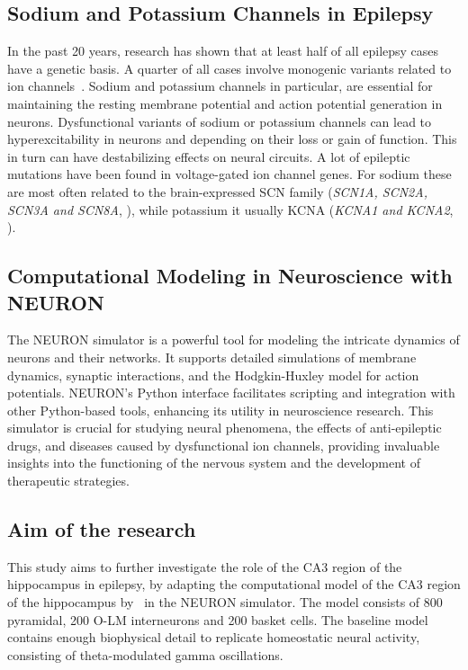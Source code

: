 \subsection{Sodium and Potassium Channels in Epilepsy}
In the past 20 years, research has shown that at least half of all epilepsy cases have a genetic basis.
A quarter of all cases involve monogenic variants related to ion channels~\parencite{strianoGeneticTestingPrecision2020,oyrerIonChannelsGenetic2018}.
Sodium and potassium channels in particular, are essential for maintaining the resting
membrane potential and action potential generation in neurons.
Dysfunctional variants of sodium or potassium channels can lead to hyperexcitability in neurons and depending on their loss or gain of function.
This in turn can have destabilizing effects on neural circuits.
A lot of epileptic mutations have been found in voltage-gated ion channel genes.
For sodium these are most often related to the brain-expressed SCN family (\textit{SCN1A, SCN2A, SCN3A and SCN8A}, \textcite{brunklausSodiumChannelEpilepsies2020}), 
while potassium it usually KCNA (\textit{KCNA1 and KCNA2}, \textcite{gaoPotassiumChannelsEpilepsy2022}).

\subsection{Computational Modeling in Neuroscience with NEURON}
The NEURON simulator is a powerful tool for modeling the intricate dynamics 
of neurons and their networks. It supports detailed simulations of membrane 
dynamics, synaptic interactions, and the Hodgkin-Huxley model for action 
potentials. NEURON's Python interface facilitates scripting and integration 
with other Python-based tools, enhancing its utility in neuroscience research.
This simulator is crucial for studying neural phenomena, the effects of 
anti-epileptic drugs, and diseases caused by dysfunctional ion channels, 
providing invaluable insights into the functioning of the nervous system 
and the development of therapeutic strategies.

\subsection{Aim of the research}
This study aims to further investigate the role of the CA3 region of the hippocampus in epilepsy, 
by adapting the computational model of the CA3 region of the hippocampus by~\textcite{neymotinKetamineDisruptsTheta2011} in the NEURON simulator.
The model consists of 800 pyramidal, 200 O-LM interneurons and 200 basket cells. 
The baseline model contains enough biophysical detail to replicate homeostatic neural activity, consisting of theta-modulated gamma oscillations.

